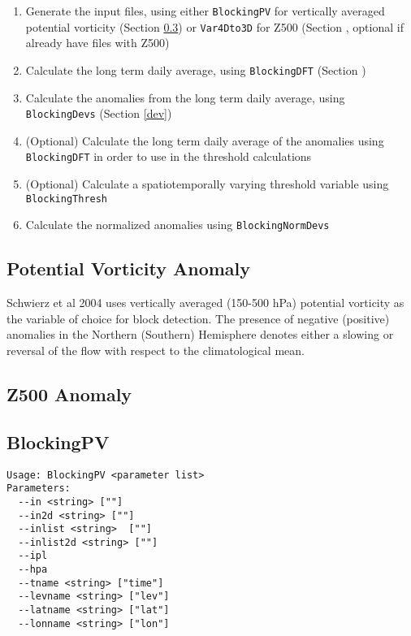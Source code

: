 \documentclass{article}
\begin{document}
\begin{enumerate}
\item Generate the input files, using either \texttt{BlockingPV} for vertically averaged potential vorticity (Section \ref{PV}) or \texttt{Var4Dto3D} for Z500 (Section , optional if already have files with Z500)
\item Calculate the long term daily average, using \texttt{BlockingDFT} (Section )
\item Calculate the anomalies from the long term daily average, using \texttt{BlockingDevs} (Section \ref{dev})
\item (Optional) Calculate the long term daily average of the anomalies using \texttt{BlockingDFT} in order to use in the threshold calculations
\item (Optional) Calculate a spatiotemporally varying threshold variable using \texttt{BlockingThresh}
\item Calculate the normalized anomalies using \texttt{BlockingNormDevs}
\end{enumerate}

\subsection{Potential Vorticity Anomaly}

Schwierz et al 2004 uses vertically averaged (150-500 hPa) potential vorticity as the variable of choice for block detection. The presence of negative (positive) anomalies in the Northern (Southern) Hemisphere denotes either a slowing or reversal of the flow with respect to the climatological mean. 

\subsection{Z500 Anomaly}

\subsection{BlockingPV}\label{PV}
\begin{verbatim}
Usage: BlockingPV <parameter list>
Parameters:
  --in <string> [""]
  --in2d <string> [""]
  --inlist <string>  [""]
  --inlist2d <string> [""]
  --ipl
  --hpa
  --tname <string> ["time"]
  --levname <string> ["lev"]
  --latname <string> ["lat"]
  --lonname <string> ["lon"]
\end{verbatim}
\end{document}
